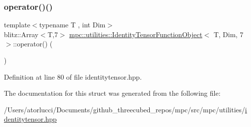\subsubsection{\texorpdfstring{operator()()}{operator()()}}
{\footnotesize\ttfamily template$<$typename T , int Dim$>$ \\
blitz\+::\+Array$<$T,7$>$ \mbox{\hyperlink{structmpc_1_1utilities_1_1_identity_tensor_function_object}{mpc\+::utilities\+::\+Identity\+Tensor\+Function\+Object}}$<$ T, Dim, 7 $>$\+::operator() (\begin{DoxyParamCaption}{ }\end{DoxyParamCaption})\hspace{0.3cm}{\ttfamily [inline]}}



Definition at line 80 of file identitytensor.\+hpp.



The documentation for this struct was generated from the following file\+:\begin{DoxyCompactItemize}
\item 
/\+Users/atorlucci/\+Documents/github\+\_\+threecubed\+\_\+repos/mpc/src/mpc/utilities/\mbox{\hyperlink{identitytensor_8hpp}{identitytensor.\+hpp}}\end{DoxyCompactItemize}
